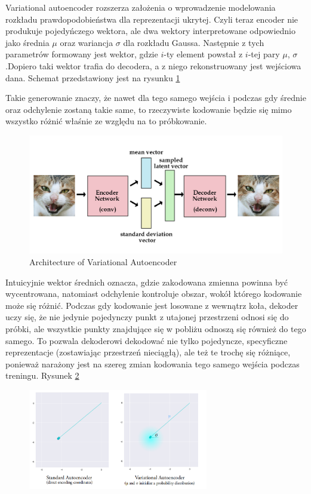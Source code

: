 Variational autoencoder rozszerza założenia o wprowadzenie modelowania rozkładu prawdopodobieństwa dla reprezentacji ukrytej. Czyli teraz encoder nie produkuje pojedyńczego wektora, ale dwa wektory interpretowane odpowiednio jako średnia $\mu$ oraz wariancja $\sigma$ dla rozkładu Gaussa. Następnie z tych parametrów formowany jest wektor, gdzie $i$-ty element powstał z $i$-tej pary $\mu$, $\sigma$.Dopiero taki wektor trafia do decodera, a z niego rekonstruowany jest wejściowa dana. Schemat przedstawiony jest na rysunku \ref{fig:vae}

Takie generowanie znaczy, że nawet dla tego samego wejścia i podczas gdy średnie oraz odchylenie zostaną takie same, to rzeczywiste kodowanie będzie się mimo wszystko różnić właśnie ze względu na to próbkowanie. 

\begin{figure}[h!]
    \centering
    \includegraphics[width=1\textwidth]{images/vae_model}
    \caption{Architecture of Variational Autoencoder}
    \label{fig:vae}
\end{figure}

Intuicyjnie wektor średnich oznacza, gdzie zakodowana zmienna powinna być wycentrowana, natomiast odchylenie kontroluje obszar, wokół którego kodowanie może się różnić. Podczas gdy kodowanie jest losowane z wewnątrz koła, dekoder uczy się, że nie jedynie pojedynczy punkt z utajonej przestrzeni odnosi się do próbki, ale wszystkie punkty znajdujące się w pobliżu odnoszą się również do tego samego. To pozwala dekoderowi dekodować nie tylko pojedyncze, specyficzne reprezentacje (zostawiając przestrzeń nieciągłą), ale też te trochę się różniące, ponieważ narażony jest na szereg zmian kodowania tego samego wejścia podczas treningu. Rysunek \ref{fig:vae_vs_stand}

\begin{figure}[h!]
    \centering
    \includegraphics[width=0.7\textwidth]{images/vae_vs_stand}
    \caption{}
    \label{fig:vae_vs_stand}
\end{figure}

